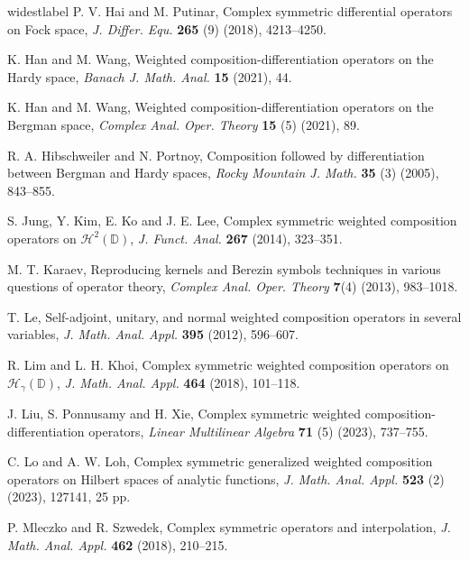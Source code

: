 \documentclass[12pt, reqno]{amsart}
\theoremstyle{definition}
\theoremstyle{remark}
\numberwithin{equation}{section}
\begin{document}
\begin{thebibliography}{widestlabel}
 {\sc P. V. Hai} and {\sc M. Putinar}, Complex symmetric differential operators on Fock space, \textit{ J. Differ. Equ.} {\bf 265} (9) (2018), 4213--4250.


 {\sc K. Han} and {\sc M. Wang}, Weighted composition-differentiation operators on the Hardy space, \textit{Banach J. Math. Anal.} {\bf 15} (2021), 44.


 {\sc K. Han} and {\sc M. Wang}, Weighted composition-differentiation operators on the Bergman space, \textit{Complex Anal. Oper. Theory} {\bf 15} (5) (2021), 89. 




 {\sc R. A. Hibschweiler} and {\sc N. Portnoy}, Composition followed by differentiation between Bergman and Hardy spaces, \textit{Rocky Mountain J. Math.} {\bf 35} (3) (2005), 843--855. 



 {\sc S. Jung, Y. Kim, E. Ko} and {\sc J. E. Lee}, Complex symmetric weighted composition operators on $\mathcal{H}^2(\mathbb{D})$, \textit{J. Funct. Anal.} {\bf 267} (2014), 323--351.

  {\sc M. T. Karaev}, Reproducing kernels and Berezin symbols techniques in various questions of operator theory, \textit{Complex Anal. Oper. Theory} {\bf 7}(4) (2013), 983--1018.


 {\sc T. Le},  Self-adjoint, unitary, and normal weighted composition operators in several variables, \textit{J. Math. Anal. Appl.} {\bf 395} (2012), 596--607. 

 {\sc R. Lim} and {\sc L. H. Khoi}, Complex symmetric weighted composition operators on $\mathcal{H}_\gamma(\mathbb{D})$, \textit{J. Math. Anal. Appl.} {\bf 464} (2018), 101--118.

 {\sc J. Liu, S. Ponnusamy} and {\sc H. Xie}, Complex symmetric weighted composition-differentiation operators, \textit{Linear Multilinear Algebra} {\bf 71} (5) (2023),  737--755.



 {\sc C. Lo} and {\sc A. W. Loh}, Complex symmetric generalized weighted composition operators on Hilbert spaces of analytic functions, \textit{J. Math. Anal. Appl.} {\bf 523} (2) (2023), 127141,  25 pp.

 {\sc P. Mleczko} and {\sc R. Szwedek}, Complex symmetric operators and interpolation, \textit{J. Math. Anal. Appl.} {\bf 462} (2018), 210--215.



\end{thebibliography}
\end{document}
